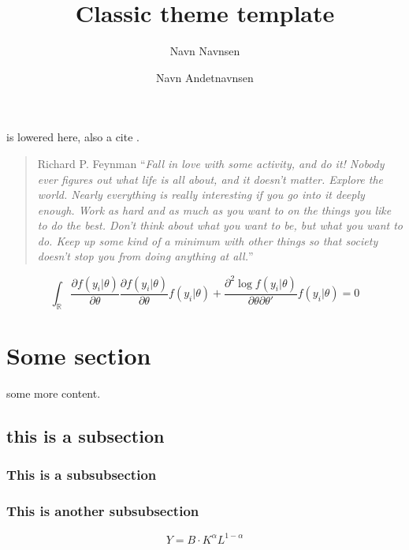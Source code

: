 \documentclass{01_preamble/classicreport}
\title{Classic theme template}
\author[a]{Navn Navnsen}
\author[b]{Navn Andetnavnsen}
\affil[a]{navn@navnsen.com}
\affil[b]{navn@andetnavnsen.com}
\begin{document}
\maketitle
\thispagestyle{empty}
\vskip24pt
\begin{abstract}
\noindent
\blindtext
\end{abstract}
\vskip24pt


 is lowered here, also a cite \citep{christensen_assessing_2015}.
\blindtext[4]
\begin{quote}{Richard P. Feynman}
    \enquote{\textit{Fall in love with some activity, and do it! Nobody ever figures out what life is all about, and it doesn't matter. Explore the world. Nearly everything is really interesting if you go into it deeply enough. Work as hard and as much as you want to on the things you like to do the best. Don't think about what you want to be, but what you want to do. Keep up some kind of a minimum with other things so that society doesn't stop you from doing anything at all.}}
\end{quote}

\noindent\blindtext[2]

\begin{equation}
   \int_{\mathbb{R}} \frac{\partial f(y_i|\theta)}{\partial \theta} \frac{\partial f(y_i|\theta)}{\partial \theta} f(y_i|\theta) 
    + \frac{\partial^2 \log f(y_i|\theta)}{\partial \theta \partial \theta'}f(y_i|\theta) = 0
\end{equation}

\blindtext
\section{Some section}
 some more content.
\blindtext 
\citep{alyass_big_2015}

\subsection{this is a subsection}
\blindtext[2]
\subsubsection{This is a subsubsection}
\blindtext
\subsubsection{This is another subsubsection}
\blindtext
\begin{equation}
    Y = B\cdot K^\alpha L^{1-\alpha}
\end{equation}
\end{document}
